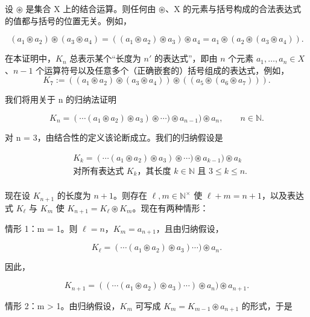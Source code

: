 \begin{example}

设 $ \circledast $ 是集合 X 上的结合运算。则任何由 $ \circledast $、X 的元素与括号构成的合法表达式的值都与括号的位置无关。例如，

\[
(a_{1}\circledast a_{2})\circledast(a_{3}\circledast a_{4})=\left((a_{1}\circledast a_{2})\circledast a_{3}\right)\circledast a_{4}=a_{1}\circledast(a_{2}\circledast(a_{3}\circledast a_{4})).
\]

\proofhead
在本证明中，$ K_n $ 总表示某个“长度为 $ n' $ 的表达式”，即由 $ n $ 个元素 $ a_1, \ldots, a_n \in X $、$ n - 1 $ 个运算符号以及任意多个（正确嵌套的）括号组成的表达式，例如，
\[
K_{7}:=\left((a_{1}\circledast a_{2})\circledast(a_{3}\circledast a_{4})\right)\circledast\left((a_{5}\circledast(a_{6}\circledast a_{7}))\right).
\]

我们将用关于 n 的归纳法证明

\[
K_{n}=\left(\cdots\left(a_{1}\circledast a_{2}\right)\circledast a_{3}\right)\circledast\cdots)\circledast a_{n-1})\circledast a_{n},\qquad n\in\mathbb{N}.
\]

对 n = 3，由结合性的定义该论断成立。我们的归纳假设是

\begin{equation*}
\begin{aligned}
&K_{k}=\left(\cdots\left(a_{1}\circledast a_{2}\right)\circledast a_{3}\right)\circledast\cdots)\circledast a_{k-1}\Big)\circledast a_{k}\\ &\text{对所有表达式 }K_{k}\text{，其长度 }k\in\mathbb{N}\text{ 且 }3\leq k\leq n.\\
\end{aligned}
\end{equation*}

现在设 $ K_{n+1} $ 的长度为 $ n+1 $。则存在 $ \ell, m \in \mathbb{N}^\times $ 使 $ \ell + m = n + 1 $，以及表达式 $ K_\ell $ 与 $ K_m $ 使 $ K_{n+1} = K_\ell \circledast K_m $。现在有两种情形：

情形 1：m = 1。则 $ \ell = n $，$ K_m = a_{n+1} $，且由归纳假设，

\[
K_{\ell}=\left(\cdots(a_{1}\circledast a_{2})\circledast a_{3}\right)\cdots)\circledast a_{n}.
\]

因此，

\[
K_{n+1}=\left(\left(\cdots(a_{1}\circledast a_{2})\circledast a_{3}\right)\cdots\right)\circledast a_{n})\circledast a_{n+1}.
\]

情形 2：m > 1。由归纳假设，$ K_m $ 可写成 $ K_m = K_{m-1} \circledast a_{n+1} $ 的形式，于是


\end{example}
